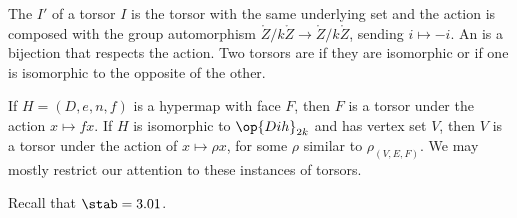 \begin{definition}
 The  $I'$ of a torsor $I$ is the torsor with the
same underlying set and the action is composed with the group automorphism
$\ring{Z}/k\ring{Z}\to\ring{Z}/k\ring{Z}$, sending $i\mapsto -i$.
  An
 is a bijection that respects the action.
Two torsors are  if they are isomorphic or if 
one is isomorphic to the opposite of the other.
\end{definition}


\begin{example} If $H=(D,e,n,f)$ is a hypermap with face $F$,
then $F$ is a torsor under the action $x \mapsto f x$.  If $H$ is
isomorphic to $\op{Dih}_{2k}$ and has vertex set $V$, then $V$ is a torsor
under the action of $x\mapsto \rho x$, for some $\rho$ similar to
 $\rho_{(V,E,F)}$.  We may mostly restrict our attention to
these instances of torsors.
\end{example}



Recall that $\stab=3.01$.

